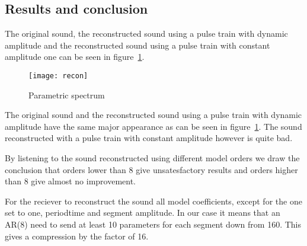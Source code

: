 \documentclass[10pt]{article}
\begin{document}
\subsection{Results and conclusion}
The original sound, the reconstructed sound using a pulse train with
dynamic amplitude and the reconstructed sound using a pulse train
with constant amplitude one can be seen in figure~\ref{fig:recon}.

\begin{figure}[!hp]

    \begin{center}
      \texttt{[image: recon]}
    \caption{Parametric spectrum \label{fig:recon}}
    \end{center}

\end{figure}

The original sound and the reconstructed sound using a pulse train
with dynamic amplitude have the same major appearance as can be seen in
figure~\ref{fig:recon}. The sound reconstructed with a pulse train with
constant amplitude however is quite bad.

By listening to the sound reconstructed using different model orders
we draw the conclusion that orders lower than $8$ give unsatesfactory
results and orders higher than $8$ give almost no improvement.

For the reciever to reconstruct the sound all model coefficients,
except for the one set to one, periodtime and segment amplitude.
In our case it means that an AR(8) need to send at least 10 parameters
for each segment down from 160. This gives a compression by the
factor of 16.
\end{document}
